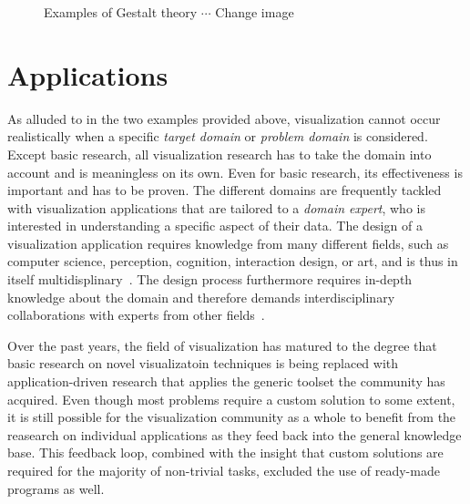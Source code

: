 \begin{figure}
  \centering
  \caption{Examples of Gestalt theory $\cdots$ Change image}
  \label{fig:motivation:gestalt}
\end{figure}

\section{Applications}
As alluded to in the two examples provided above, visualization cannot occur realistically when a specific \emph{target domain} or \emph{problem domain} is considered.  Except basic research, all visualization research has to take the domain into account and is meaningless on its own.  Even for basic research, its effectiveness is important and has to be proven.  The different domains are frequently tackled with visualization applications that are tailored to a \emph{domain expert}, who is interested in understanding a specific aspect of their data.  The design of a visualization application requires knowledge from many different fields, such as computer science, perception, cognition, interaction design, or art, and is thus in itself multidisplinary~\cite{mccormick1987visualization}.  The design process furthermore requires in-depth knowledge about the domain and therefore demands interdisciplinary collaborations with experts from other fields~\cite{kirby2013visualization}.

Over the past years, the field of visualization has matured to the degree that basic research on novel visualizatoin techniques is being replaced with application-driven research that applies the generic toolset the community has acquired.  Even though most problems require a custom solution to some extent, it is still possible for the visualization community as a whole to benefit from the reasearch on individual applications as they feed back into the general knowledge base.  This feedback loop, combined with the insight that custom solutions are required for the majority of non-trivial tasks, excluded the use of ready-made programs as well.



